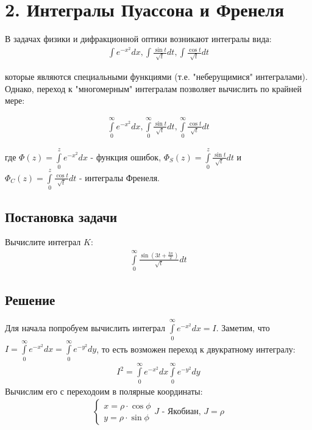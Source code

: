 \documentclass[12pt, a4paper]{article}
\begin{document}
\section*{2. Интегралы Пуассона и Френеля}
В задачах физики и дифракционной оптики возникают интегралы вида:
\begin{equation*}
\begin{aligned}
\int\limits e^{-x^2}dx, \int\limits \frac{\sin{t}}{\sqrt{t}} dt, \int\limits \frac{\cos{t}}{\sqrt{t}} dt
\end{aligned}
\end{equation*}

которые являются специальными функциями (т.е. "неберущимися" интегралами). Однако, переход
к "многомерным" интегралам позволяет вычислить по крайней мере:

\begin{equation*}
\begin{aligned}
\int\limits_0^{\infty} e^{-x^2}dx, \int\limits_0^{\infty} \frac{\sin{t}}{\sqrt{t}} dt, \int\limits_0^{\infty} \frac{\cos{t}}{\sqrt{t}} dt
\end{aligned}
\end{equation*}

где $\Phi(z) = \int\limits_0^{z} e^{-x^2}dx$ - функция ошибок, $\Phi_{S}(z) = \int\limits_0^{z} \frac{\sin{t}}{\sqrt{t}} dt$ и $\Phi_{C}(z) = \int\limits_0^{z} \frac{\cos{t}}{\sqrt{t}} dt$ - интегралы Френеля.

\subsection*{Постановка задачи}

Вычислите интеграл $K$:
\begin{equation*}
\begin{aligned}
\int\limits_0^{\infty} \frac{\sin(3t + \frac{3\pi}{2})}{\sqrt{t}} dt
\end{aligned}
\end{equation*}

\subsection*{Решение}

Для начала попробуем вычислить интеграл $\int\limits_0^{\infty} e^{-x^2}dx = I$. Заметим, что $I = \int\limits_0^{\infty} e^{-x^2}dx =  \int\limits_0^{\infty} e^{-y^2}dy$, то есть возможен переход к двукратному интегралу:
\begin{equation*}
\begin{aligned}
I^2 = \int\limits_0^{\infty} e^{-x^2}dx \int\limits_0^{\infty} e^{-y^2}dy
\end{aligned}
\end{equation*}
Вычислим его с переходоим в полярные координаты:
\begin{equation*}
\begin{aligned}
\begin{cases}
x = \rho \cdot \cos{\phi}\\
y= \rho \cdot \sin{\phi}
\end{cases}
J \text{ - Якобиан, } J = \rho
\end{aligned}
\end{equation*}
\end{document}
